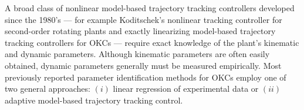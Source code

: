 



A broad class of nonlinear model-based trajectory tracking controllers
developed since the 1980's --- for example Koditschek's nonlinear
tracking controller for second-order rotating plants
\cite{Koditschek1988} and exactly linearizing model-based trajectory
tracking controllers for \acp{OKC}
\cite{freund.ijrr.83,luh&walker&paul.tran.aut.con.80} --- require
exact knowledge of the plant's kinematic and dynamic parameters.
%
Although kinematic parameters are often easily obtained, dynamic
parameters generally must be measured empirically.
%
%
Most previously reported parameter identification methods for
\acp{OKC} employ one of two general approaches: $(i)$ linear
regression of experimental data or $(ii)$ adaptive model-based
trajectory tracking control.


